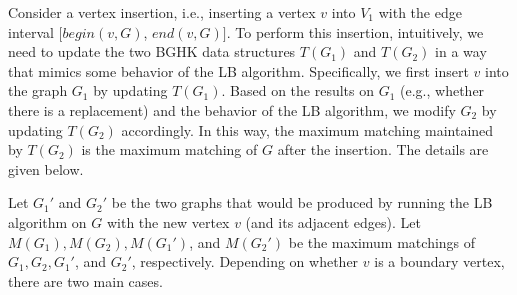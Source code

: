 \documentclass[11pt]{article}
\begin{document}
Consider a vertex insertion, i.e., inserting a vertex $v$ into $V_1$ with the edge
interval $[begin(v,G)$, $end(v,G)]$. To perform this insertion, intuitively, we need to
update the two BGHK data structures $T(G_1)$ and $T(G_2)$ in a way that mimics some
behavior of the LB algorithm. Specifically, we first insert $v$ into the graph
$G_1$ by updating $T(G_1)$. Based on the results on $G_1$
(e.g., whether there is a replacement) and the behavior of the LB algorithm,
we modify $G_2$ by updating $T(G_2)$ accordingly.
In this way, the maximum matching maintained by
$T(G_2)$ is the maximum matching of $G$ after the insertion.
The details are given below.

Let $G_1'$ and $G_2'$ be the two graphs
that would be produced by running the LB algorithm on $G$ with the new vertex $v$
(and its adjacent edges). Let $M(G_1), M(G_2), M(G_1')$, and $M(G_2')$ be the maximum
matchings of $G_1, G_2, G_1'$, and $G_2'$, respectively.
Depending on whether $v$ is a boundary
vertex, there are two main cases.
\end{document}

